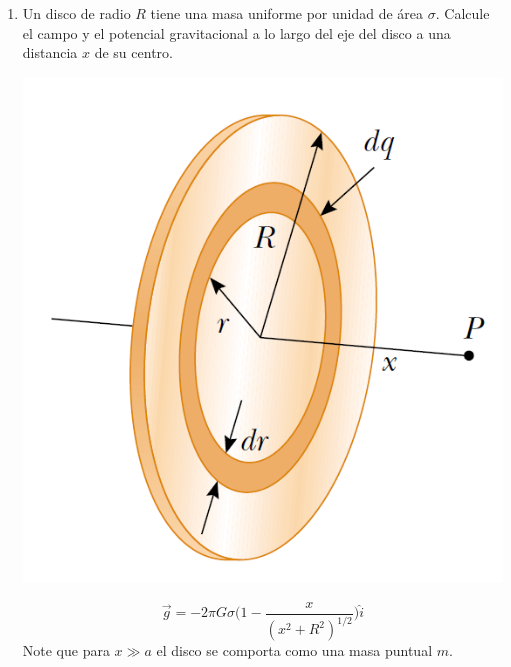 \documentclass[11pt,twocolumn]{article}
\begin{document}
\begin{enumerate}
\item Un disco de radio $R$ tiene una masa uniforme por unidad de área $\sigma$. Calcule el campo y el potencial gravitacional a lo largo del eje del disco a una distancia $x$ de su centro.
{
\begin{center}
\includegraphics[scale=0.2]{disco}
\end{center}
}
\begin{displaymath}
\vec{g}=-2\pi G \sigma \Big(1-\dfrac{x}{(x^2+R^2)^{1/2}}\Big)\hat{i}
\end{displaymath}
\small{Note que para $x\gg a$ el disco se comporta como una masa puntual $m$.} 


\end{enumerate}
\end{document}
